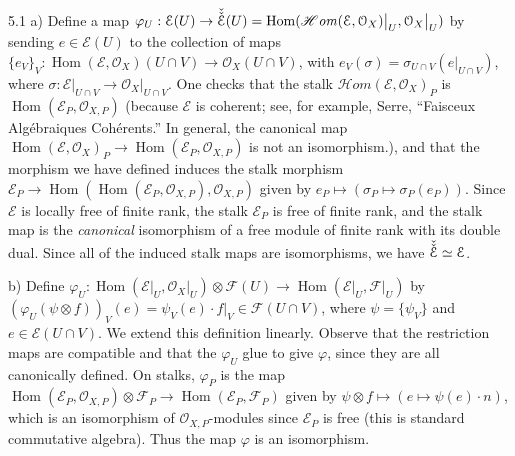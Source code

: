 \documentclass{report}
\newcommand{\F}{\mathcal{F}}
\newcommand{\E}{\mathcal{E}}
\renewcommand{\O}{\mathcal{O}}
\newcommand{\HOM}{\mathscr{H}\mathit{om}}
\DeclareMathOperator{\Hom}{Hom}
\begin{document}
 \section{}
 
 5.1	a)	Define a map $\varphi_U: \E(U)\rightarrow \Check{\Check{\E}}(U)=\Hom(\HOM(\E,\O_X)\big|_U,\O_X\big|_U)$
 by sending $e\in \E(U)$ to the collection of maps $\{e_V\}_V:\Hom(\E,\O_X)(U\cap V)\rightarrow \O_X(U\cap V)$,
 with $e_V(\sigma)=\sigma_{U\cap V}(e\big|_{U\cap V})$, where $\sigma:\E\big|_{U\cap V}\rightarrow \O_X\big|_{U\cap V}$.
 One checks that the stalk $\HOM(\E,\O_X)_P$ is $\Hom(\E_P,\O_{X,P})$ (because $\E$ is coherent; see, for example,
 Serre, ``Faisceux Alg\'{e}braiques Coh\'{e}rents.''  In general, the canonical map $\Hom(\E,\O_X)_P\rightarrow \Hom(\E_P,\O_{X,P})$
 is not an isomorphism.), and that the morphism we have defined induces the stalk
 morphism $\E_P\rightarrow \Hom(\Hom(\E_P,\O_{X,P}),\O_{X,P})$ given by $e_P\mapsto (\sigma_P\mapsto \sigma_P(e_P))$.
 Since $\E$ is locally free of finite rank, the stalk $\E_P$ is free of finite rank, and the stalk map is the {\em canonical}
 isomorphism of a free module of finite rank with its double dual.	Since all of the induced stalk maps
 are isomorphisms, we have $\Check{\Check{\E}}\simeq \E$.
 
 \noindent
b)  Define $\varphi_U:\Hom(\E\big|_U,\O_X\big|_U)\otimes \F(U)\rightarrow \Hom(\E\big|_U,\F\big|_U)$
by $(\varphi_U(\psi\otimes f))_V(e)=\psi_V(e)\cdot f\big|_V\in \F(U\cap V)$, where $\psi=\{\psi_V\}$ and $e\in \E(U\cap V)$.
We extend this definition linearly.  Observe that the restriction maps are compatible and that the $\varphi_U$ glue
to give $\varphi$, since they are all canonically defined.	On stalks, $\varphi_P$ is the map
$\Hom(\E_P,\O_{X,P})\otimes \F_P\rightarrow \Hom(\E_P,\F_P)$ given by $\psi\otimes f\mapsto (e\mapsto \psi(e)\cdot n)$,
which is an isomorphism of $\O_{X,P}$-modules since $\E_P$ is free (this is standard commutative algebra).
Thus the map $\varphi$ is an isomorphism.
 
\end{document}
